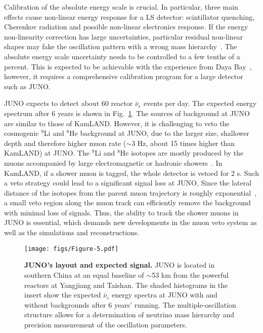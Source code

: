 \documentclass[aps,twocolumn,preprintnumbers,amsmath,superscriptaddress,amssymb,floats,nofootinbib]{revtex4-1}
\begin{document}
Calibration of the absolute energy scale is crucial. 
In particular, three main effects cause non-linear energy response for a LS detector: scintillator quenching, Cherenkov radiation and possible non-linear electronics response. 
If the energy non-linearity correction has large uncertainties, particular residual non-linear shapes may fake the oscillation pattern with a wrong mass hierarchy~\cite{Qian-PRD13}. 
The absolute energy scale uncertainty needs to be controlled to a few tenths of a percent. 
This is expected to be achievable with the experience from Daya Bay~\cite{Zhang-Neutrino14}, however, it requires a comprehensive calibration program for a large detector such as JUNO.

JUNO expects to detect about 60 reactor $\bar\nu_e$ events per day. The expected energy spectrum after 6 years is shown in Fig.~\ref{fig:juno}.
The sources of background at JUNO are similar to those of KamLAND. 
However, it is challenging to veto the cosmogenic $^9$Li and $^8$He background at JUNO, due to the larger size, shallower depth and therefore higher muon rate ($\sim$3 Hz, about 15 times higher than KamLAND) at JUNO. 
The $^9$Li and $^8$He isotopes are mostly produced by the muons accompanied by large electromagnetic or hadronic showers~\cite{KamLAND-spall}. In KamLAND, if a shower muon is tagged, the whole detector is vetoed for 2 s. Such a veto strategy could lead to a significant signal loss at JUNO. 
Since the lateral distance of the isotopes from the parent muon trajectory is roughly exponential~\cite{KamLAND-spall}, a small veto region along the muon track can efficiently remove the background with minimal loss of signals. Thus, the ability to track the shower muons in JUNO is essential, which demands new developments in the muon veto system as well as the simulations and reconstructions.

\begin{figure}[tb] \label{fig:juno}
  \centering
  \texttt{[image: figs/Figure-5.pdf]}
  \caption{{\bf JUNO's layout and expected signal.} JUNO is located in southern China at an equal baseline of $\sim$53 km from the powerful reactors at Yangjiang and Taishan. The shaded histograms in the insert show the expected $\bar\nu_e$ energy spectra at JUNO with and without backgrounds after 6 years' running. The multiple-oscillation structure allows for a determination of neutrino mass hierarchy and precision measurement of the oscillation parameters.}
\end{figure}
\end{document}
